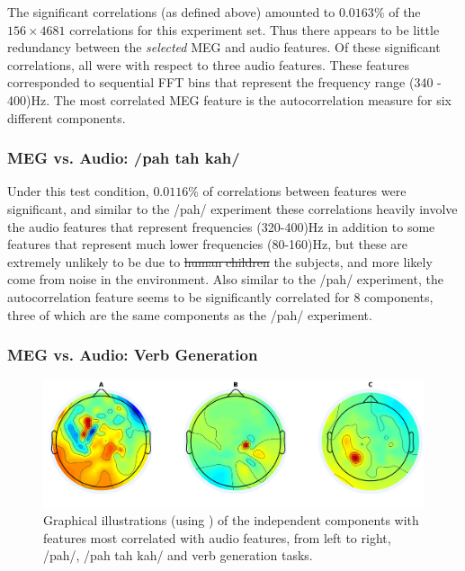 \documentclass[a4paper]{article}
\begin{document}
The significant correlations (as defined above) amounted to $0.0163$\% of the $156 \times 4681$ correlations for this experiment set. Thus there appears to be little redundancy between the \textit{selected} MEG and audio features. Of these significant correlations, all were with respect to three audio features. These features corresponded to sequential FFT bins that represent the frequency range (340 - 400)Hz. The most correlated MEG feature is the autocorrelation measure for six different components.

\subsubsection{MEG vs. Audio: /pah tah kah/}

Under this test condition, $0.0116$\% of correlations between features were significant, and similar to the /pah/ experiment these correlations heavily involve the audio features that represent frequencies (320-400)Hz in addition to some features that represent much lower frequencies (80-160)Hz, but these are extremely unlikely to be due to \st{human children} the subjects, and more likely come from noise in the environment. Also similar to the /pah/ experiment, the autocorrelation feature seems to be significantly correlated for 8 components, three of which are the same components as the /pah/ experiment.


\subsubsection{MEG vs. Audio: Verb Generation}

\begin{figure}[t]
  \centering
  \includegraphics[width=\linewidth]{AllComponents.png}
  \caption{Graphical illustrations (using \cite{Delorme04eeglab}) of the independent components with features most correlated with audio features, from left to right, /pah/, /pah tah kah/ and verb generation tasks.}
  \label{fig:components}
\end{figure}
\end{document}
